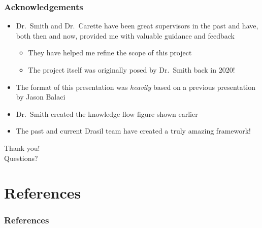\documentclass{beamer}
\begin{document}

\begin{frame}
    \frametitle{Acknowledgements}

    \begin{itemize}
        \item Dr.~Smith and Dr.~Carette have been great supervisors in the
              past and have, both then and now, provided me with valuable guidance
              and feedback
              \begin{itemize}
                  \item They have helped me refine the scope of this project
                  \item The project itself was originally posed by Dr.~Smith back
                        in 2020!
              \end{itemize}
        \item<2-> The format of this presentation was \emph{heavily} based on
            a previous presentation by Jason Balaci
        \item<2-> Dr.~Smith created the knowledge flow figure shown earlier
        \item<3-> The past and current Drasil team have created a truly amazing
            framework!
    \end{itemize}
\end{frame}


\begin{frame}
    \center
    \huge{Thank you!}\\
    \normalsize{Questions?}
\end{frame}


\section{References}

\begin{frame}%
    \frametitle{References}

    
    
\end{frame}
\end{document}

